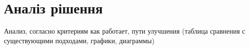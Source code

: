\section{Аналіз рішення}
 Анализ, согласно критериям как работает, пути улучшения (таблица сравнения с существующими подходами, графики, диаграммы)